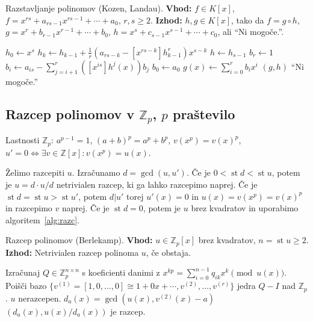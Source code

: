 \documentclass[a4paper,oneside,10pt]{article}
\theoremstyle{definition}
\newcommand{\Z}{\ensuremath{\mathbb{Z}}}
\newcommand{\st}{\operatorname{st}}
\let\oldtextbf\textbf
\renewcommand{\textbf}[1]{\oldtextbf{\boldmath #1}}
\begin{document}
\begin{algorithm}[!ht]
\caption{Razstavljanje polinomov (Kozen, Landau). \newline
\textbf{Vhod:} $f \in K[x]$, $f = x^{rs} + a_{rs-1} x^{rs- 1} + \cdots + a_0$, $r, s \geq 2$. \newline
\textbf{Izhod:} $h, g \in K[x]$, tako da $f = g \circ h$,
$g = x^r + b_{r-1} x^{r-1} + \cdots + b_0$, $h = x^s + c_{s-1} x^{s-1} + \cdots + c_0$,  ali ``Ni mogoče.''.}
\label{alg:razst}
\begin{algorithmic}[1]
\State $h_0 \gets x^s$ 
    \State $h_k \gets h_{k-1} + \frac{1}{r}(a_{rs-k} - [x^{rs-k}]h_{k-1}^r) x^{s-k}$
\EndFor
\State $h \gets h_{s-1}$
\State $b_r \gets 1$ 
 
\State $b_i \gets a_{is} - \sum_{j=i+1}^r ([x^{is}]h^j(x))b_j$
\EndFor
\State $b_0 \gets a_0$
\State $g(x) \gets \sum_{i=0}^r b_ix^i$
\State \Return $(g, h)$ 
\Else
\State \Return ``Ni mogoče.''
\EndIf
\EndProcedure
\end{algorithmic}
\end{algorithm}

\subsection*{Razcep polinomov v $\Z_p$, $p$ praštevilo}
Lastnosti $\Z_p$: $a^{p-1} = 1$, $(a+b)^p = a^p + b^p$, $v(x^p) = v(x)^p$, $u' = 0 \iff \exists v \in \Z[x]\colon v(x^p) = u(x)$.

Želimo razcepiti $u$. Izračunamo $d = \gcd(u, u')$. Če je $0 < \st d < \st u$, potem je $u = d \cdot u/d$ netrivialen razcep, ki ga lahko razcepimo naprej.
Če je $\st d = \st u > \st u'$, potem $d | u'$ torej $u'(x) =0$ in
$u(x) = v(x^p) = v(x)^p$ in razcepimo $v$ naprej.
Če je $\st d = 0$, potem je $u$ brez kvadratov in uporabimo algoritem~\ref{alg:razc}.

\begin{algorithm}[!ht]
\caption{Razcep polinomov (Berlekamp). \newline
\textbf{Vhod:} $u \in \Z_p[x]$ brez kvadratov, $n = \st u \geq 2$. \newline
\textbf{Izhod:} Netrivialen razcep polinoma $u$, če obstaja.}
\label{alg:razc}
\begin{algorithmic}[1]
\State Izračunaj $Q \in \Z_p^{n\times n}$ s koeficienti danimi z
$x^{kp} = \sum_{i=0}^{n-1} q_{ik} x^k \pmod{u(x)}$.
\State Poišči bazo $\{ v^{(1)} = [1,0,\ldots,0] \cong 1 + 0x + \cdots, v^{(2)}, \ldots, v^{(r)}\}$ jedra $Q - I$ nad $\Z_p$.
\State \Return $u$ nerazcepen.
\Else
{}
\State $d_a(x) = \gcd(u(x), v^{(2)}(x) - a)$
\If{$\st d_a > 0$}
\State \Return $(d_a(x), u(x) / d_a(x))$ je razcep.
\EndIf
{}
\EndFor
{}
\EndIf
{}
\EndProcedure
\end{algorithmic}
\end{algorithm}
\end{document}

